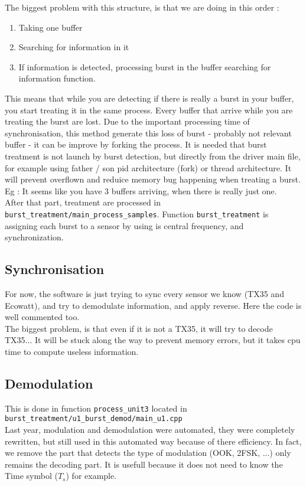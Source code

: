 The biggest problem with this structure, is that we are doing in this order :
\begin{enumerate}
\item Taking one buffer
\item Searching for information in it
\item If information is detected, processing burst in the buffer searching for information function.
\end{enumerate}
This means that while you are detecting if there is really a burst in your buffer, you start treating it in the same process. Every buffer that arrive while you are treating the burst are lost. Due to the important processing time of synchronisation, this method generate this loss of burst - probably not relevant buffer - it can be improve by forking the process. It is needed that burst treatment is not launch by burst detection, but directly from the driver main file, for example using father / son pid architecture (fork) or thread architecture. It will prevent overflown and reduice memory bug happening when treating a burst. Eg : It seems like you have 3 buffers arriving, when there is really just one.\\
After that part, treatment are processed in \texttt{burst\_treatment/main\_process\_samples}. Function \texttt{burst\_treatment} is assigning each burst to a sensor by using is central frequency, and synchronization. 
\subsection{Synchronisation}
For now, the software is just trying to sync every sensor we know (TX35 and Ecowatt), and try to demodulate information, and apply reverse. Here the code is well commented too.\\
The biggest problem, is that even if it is not a TX35, it will try to decode TX35... It will be stuck along the way to prevent memory errors, but it takes cpu time to compute useless information.

\subsection{Demodulation}
This is done in function \texttt{process\_unit3} located in \texttt{burst\_treatment/u1\_burst\_demod/main\_u1.cpp}\\
Last year, modulation and demodulation were automated, they were completely rewritten, but still used in this automated way because of there efficiency. In fact, we remove the part that detects the type of modulation (OOK, 2FSK, ...) only remains the decoding part. It is usefull because it does not need to know the Time symbol ($T_s$) for example.


